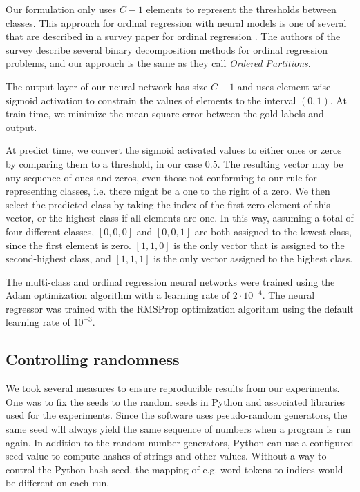 Our formulation only uses $C-1$ elements to represent the thresholds between
classes. This approach for ordinal regression with neural models is one of
several that are described in a survey paper for ordinal regression
\autocite{gutierrez2016ordinal}. The authors of the survey describe several
binary decomposition methods for ordinal regression problems, and our
approach is the same as they call \emph{Ordered Partitions}.

The output layer of our neural network has size $C-1$ and uses element-wise
sigmoid activation to constrain the values of elements to the interval
$(0,1)$. At train time, we minimize the mean square error between the gold
labels and output.

At predict time, we convert the sigmoid activated values to either ones or
zeros by comparing them to a threshold, in our case $0.5$. The resulting
vector may be any sequence of ones and zeros, even those not conforming to
our rule for representing classes, i.e. there might be a one to the right of
a zero. We then select the predicted class by taking the index of the first
zero element of this vector, or the highest class if all elements are one. In
this way, assuming a total of four different classes, $[0,0,0]$ and $[0,0,1]$
are both assigned to the lowest class, since the first element is zero.
$[1,1,0]$ is the only vector that is assigned to the second-highest class,
and $[1,1,1]$ is the only vector assigned to the highest class.

The multi-class and ordinal regression neural networks were trained using the
Adam optimization algorithm \autocite{kingma2014adam} with a learning rate of
$2\cdot 10^{-4}$. The neural regressor was trained with the RMSProp
optimization algorithm using the default learning rate of $10^{-3}$.


\subsection{Controlling randomness}

We took several measures to ensure reproducible results from our experiments.
One was to fix the seeds to the random seeds in Python and associated libraries
used for the experiments. Since the software uses pseudo-random generators,
the same seed will always yield the same sequence of numbers when a program
is run again. In addition to the random number generators, Python can use a
configured seed value to compute hashes of strings and other values. Without a
way to control the Python hash seed, the mapping of e.g. word tokens to indices
would be different on each run.

